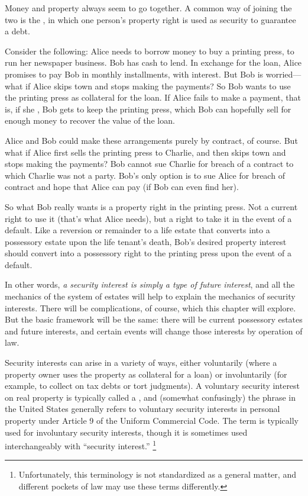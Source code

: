 Money and property always seem to go together. A common way of joining the
two is the , in which one person's property right is
used as security to guarantee a debt.

Consider the following: Alice needs to borrow money to buy a printing press, to
run her newspaper business. Bob has cash to lend. In exchange for the
loan, Alice promises to pay Bob in monthly installments, with interest. But Bob
is worried---what if Alice skips town and stops making the payments? So Bob
wants to use the printing press as collateral for the loan. If Alice fails to
make a payment, that is, if she , Bob gets to keep the
printing press, which Bob can hopefully sell for enough money to recover the
value of the loan.


Alice and Bob could make these arrangements purely by contract, of course. But
what if Alice first sells the printing press to Charlie, and then skips town and
stops making the payments? Bob cannot sue Charlie for breach of a contract to
which Charlie was not a party. Bob's only option is to sue Alice for breach of
contract and hope that Alice can pay (if Bob can even find her).

So what Bob really wants is a property right in the printing press. Not a
current right to use it (that's what Alice needs), but a right to take it in the
event of a default. Like a reversion or remainder to a life estate that converts
into a possessory estate upon the life tenant's death, Bob's desired property
interest should convert into a possessory right to the printing press upon the
event of a default.

In other words, \emph{a security interest is simply a type of future interest},
and all the mechanics of the system of estates will help to explain the
mechanics of security interests. There will be complications, of course, which
this chapter will explore. But the basic framework will be the same: there will
be current possessory estates and future interests, and certain events will
change those interests by operation of law.

Security interests can arise in a variety of ways, either voluntarily (where a
property owner uses the property as collateral for a loan) or involuntarily
(for example, to collect on tax debts or tort judgments). A voluntary security
interest on real property is typically called a , and (somewhat
confusingly) the phrase  in the United States
generally
refers to voluntary security interests in personal property under Article 9 of
the Uniform Commercial Code. The term  is typically used for
involuntary
security interests, though it is sometimes used interchangeably with ``security
interest.'' \unskip\footnote{Unfortunately, this terminology is not standardized
as a general matter, and different pockets of law may use these terms
differently.}

